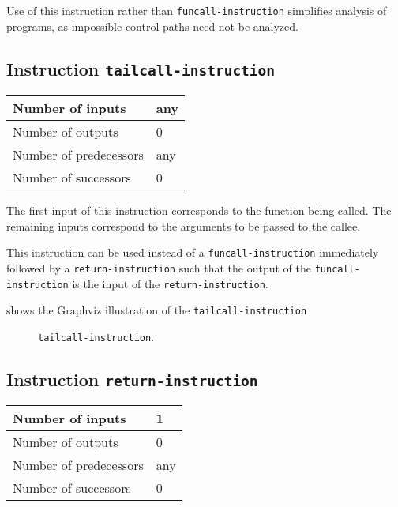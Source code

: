 Use of this instruction rather than \texttt{funcall-instruction}
simplifies analysis of programs, as impossible control paths need not
be analyzed.

\subsection{Instruction \texttt{tailcall-instruction}}
\label{mir-instruction-tailcall}

\begin{tabular}{|l|l|}
\hline
Number of inputs & any\\
\hline
Number of outputs & 0\\
\hline
Number of predecessors & any\\
\hline
Number of successors & 0\\
\hline
\end{tabular}

The first input of this instruction corresponds to the function being
called.  The remaining inputs correspond to the arguments to be passed
to the callee.

This instruction can be used instead of a \texttt{funcall-instruction}
immediately followed by a \texttt{return-instruction} such that the
output of the \texttt{funcall-instruction} is the input of the
\texttt{return-instruction}.

 shows the Graphviz illustration of the
\texttt{tailcall-instruction}

\begin{figure}
\begin{center}
\end{center}
\caption{\label{fig-tailcall-instruction}
\texttt{tailcall-instruction}.}
\end{figure}

\subsection{Instruction \texttt{return-instruction}}
\label{mir-instruction-return}

\begin{tabular}{|l|l|}
\hline
Number of inputs & 1\\
\hline
Number of outputs & 0\\
\hline
Number of predecessors & any\\
\hline
Number of successors & 0\\
\hline
\end{tabular}


